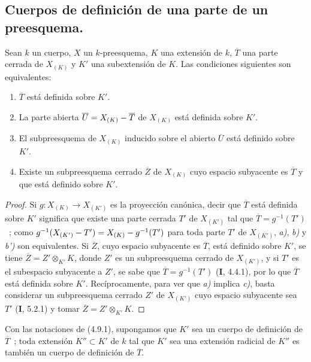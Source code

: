 \subsection{Cuerpos de definición de una parte de un preesquema.}

\begin{proposition}[4.9.1]
\label{IV.2.4.9.1-fr}
Sean $k$ un cuerpo, $X$ un $k$-preesquema, $K$ una extensión de $k$,
$\overline T$ una parte cerrada de $X_{(K)}$ y $K'$ una subextensión de $K$.
Las condiciones siguientes son equivalentes:
\begin{enumerate}
\item[\textup{a)}] $\overline T$ está definida sobre $K'$.
\item[\textup{b)}] La parte abierta $\overline U=X_{(K)}-\overline T$ de $X_{(K)}$
está definida sobre $K'$.
\item[\textup{b')}] El subpreesquema de $X_{(K)}$ inducido sobre el abierto
$\overline U$ está definido sobre $K'$.
\item[\textup{c)}] Existe un subpreesquema cerrado $\overline Z$ de $X_{(K)}$ cuyo
espacio subyacente es $\overline T$ y que está definido sobre $K'$.
\end{enumerate}
\end{proposition}

\begin{proof}
Si $g:X_{(K)}\to X_{(K')}$ es la proyección canónica, decir que
$\overline T$ está definida sobre $K'$ significa que existe una parte cerrada
$T'$ de $X_{(K')}$ tal que $\overline T=g^{-1}(T')$~; como
$g^{-1}(X_{(K')}- T')=X_{(K)}- g^{-1}(T')$ para toda parte $T'$ de
$X_{(K')}$, \emph{a)}, \emph{b)} y \emph{b')} son equivalentes. Si $\overline Z$, cuyo espacio
subyacente es $\overline T$, está definido sobre $K'$, se tiene
$\overline Z=Z'\otimes_{K'}K$, donde $Z'$ es un subpreesquema cerrado de
$X_{(K')}$, y si $T'$ es el subespacio subyacente a $Z'$, se sabe que
$\overline T=g^{-1}(T')$ (\textbf I, 4.4.1), por lo que $\overline T$ está definida
sobre $K'$. Recíprocamente, para ver que \emph{a)} implica \emph{c)}, basta considerar un
subpreesquema cerrado $Z'$ de $X_{(K')}$ cuyo espacio subyacente sea $T'$
(\textbf I, 5.2.1) y tomar $\overline Z=Z'\otimes_{K'}K$.
\end{proof}

\begin{corollary}[4.9.2]
\label{IV.2.4.9.2-fr}
Con las notaciones de \textup{(4.9.1)}, supongamos que $K'$ sea un cuerpo de definición
de $\overline T$~; toda extensión $K''\subset K'$ de $k$ tal que $K'$ sea una
extensión radicial de $K''$ es también un cuerpo de definición de
$\overline T$.
\end{corollary}


